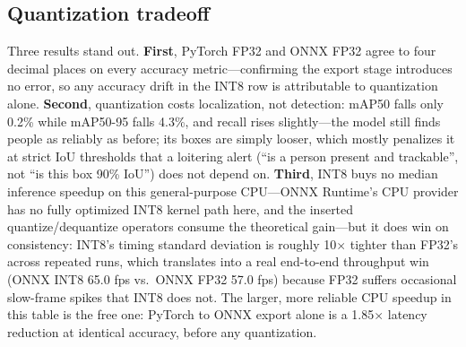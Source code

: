 \documentclass[11pt]{article}
\begin{document}
\subsection{Quantization tradeoff}
\label{sec:quant-results}

\begin{table}[h]
\centering
{}
\caption{All three arms on the identical 4{,}665-image validation split,
identical labels, \texttt{batch=1}, \texttt{rect=False}, Apple M4 Pro CPU.
INT8 is 72.4\% smaller than ONNX FP32 for a 0.2-point mAP50 cost. Because
labels are held constant across all three arms (Section~\ref{sec:method-ablation}),
the \emph{deltas} between rows are a valid measurement even though the
absolute mAP anchor is not (Section~\ref{sec:limitations}).}
\label{tab:quant-tradeoff}
\end{table}

Three results stand out. \textbf{First}, PyTorch FP32 and ONNX FP32 agree to
four decimal places on every accuracy metric---confirming the export stage
introduces no error, so any accuracy drift in the INT8 row is attributable
to quantization alone. \textbf{Second}, quantization costs localization, not
detection: mAP50 falls only 0.2\% while mAP50-95 falls 4.3\%, and recall
rises slightly---the model still finds people as reliably as before; its
boxes are simply looser, which mostly penalizes it at strict IoU thresholds
that a loitering alert (``is a person present and trackable'', not ``is this
box 90\% IoU'') does not depend on. \textbf{Third}, INT8 buys no median
inference speedup on this general-purpose CPU---ONNX Runtime's CPU provider
has no fully optimized INT8 kernel path here, and the inserted
quantize/dequantize operators consume the theoretical gain---but it does win
on consistency: INT8's timing standard deviation is roughly 10$\times$
tighter than FP32's across repeated runs, which translates into a real
end-to-end throughput win (ONNX INT8 65.0 fps vs.\ ONNX FP32 57.0 fps)
because FP32 suffers occasional slow-frame spikes that INT8 does not. The
larger, more reliable CPU speedup in this table is the free one: PyTorch to
ONNX export alone is a 1.85$\times$ latency reduction at identical accuracy,
before any quantization.
\end{document}
